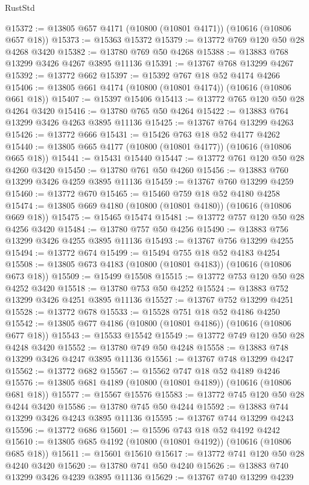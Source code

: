 \begin{lexlean}{RustStd}
\begin{coremodule}
@15372 := @13805 @657 @4171 (@10800 (@10801 @4171)) (@10616 (@10806 @657 @18))
@15373 := @15363 @15372
@15379 := @13772 @769 @120 @50 @28 @4268 @3420
@15382 := @13780 @769 @50 @4268
@15388 := @13883 @768 @13299 @3426 @4267 @3895 @11136
@15391 := @13767 @768 @13299 @4267
@15392 := @13772 @662
@15397 := @15392 @767 @18 @52 @4174 @4266
@15406 := @13805 @661 @4174 (@10800 (@10801 @4174)) (@10616 (@10806 @661 @18))
@15407 := @15397 @15406
@15413 := @13772 @765 @120 @50 @28 @4264 @3420
@15416 := @13780 @765 @50 @4264
@15422 := @13883 @764 @13299 @3426 @4263 @3895 @11136
@15425 := @13767 @764 @13299 @4263
@15426 := @13772 @666
@15431 := @15426 @763 @18 @52 @4177 @4262
@15440 := @13805 @665 @4177 (@10800 (@10801 @4177)) (@10616 (@10806 @665 @18))
@15441 := @15431 @15440
@15447 := @13772 @761 @120 @50 @28 @4260 @3420
@15450 := @13780 @761 @50 @4260
@15456 := @13883 @760 @13299 @3426 @4259 @3895 @11136
@15459 := @13767 @760 @13299 @4259
@15460 := @13772 @670
@15465 := @15460 @759 @18 @52 @4180 @4258
@15474 := @13805 @669 @4180 (@10800 (@10801 @4180)) (@10616 (@10806 @669 @18))
@15475 := @15465 @15474
@15481 := @13772 @757 @120 @50 @28 @4256 @3420
@15484 := @13780 @757 @50 @4256
@15490 := @13883 @756 @13299 @3426 @4255 @3895 @11136
@15493 := @13767 @756 @13299 @4255
@15494 := @13772 @674
@15499 := @15494 @755 @18 @52 @4183 @4254
@15508 := @13805 @673 @4183 (@10800 (@10801 @4183)) (@10616 (@10806 @673 @18))
@15509 := @15499 @15508
@15515 := @13772 @753 @120 @50 @28 @4252 @3420
@15518 := @13780 @753 @50 @4252
@15524 := @13883 @752 @13299 @3426 @4251 @3895 @11136
@15527 := @13767 @752 @13299 @4251
@15528 := @13772 @678
@15533 := @15528 @751 @18 @52 @4186 @4250
@15542 := @13805 @677 @4186 (@10800 (@10801 @4186)) (@10616 (@10806 @677 @18))
@15543 := @15533 @15542
@15549 := @13772 @749 @120 @50 @28 @4248 @3420
@15552 := @13780 @749 @50 @4248
@15558 := @13883 @748 @13299 @3426 @4247 @3895 @11136
@15561 := @13767 @748 @13299 @4247
@15562 := @13772 @682
@15567 := @15562 @747 @18 @52 @4189 @4246
@15576 := @13805 @681 @4189 (@10800 (@10801 @4189)) (@10616 (@10806 @681 @18))
@15577 := @15567 @15576
@15583 := @13772 @745 @120 @50 @28 @4244 @3420
@15586 := @13780 @745 @50 @4244
@15592 := @13883 @744 @13299 @3426 @4243 @3895 @11136
@15595 := @13767 @744 @13299 @4243
@15596 := @13772 @686
@15601 := @15596 @743 @18 @52 @4192 @4242
@15610 := @13805 @685 @4192 (@10800 (@10801 @4192)) (@10616 (@10806 @685 @18))
@15611 := @15601 @15610
@15617 := @13772 @741 @120 @50 @28 @4240 @3420
@15620 := @13780 @741 @50 @4240
@15626 := @13883 @740 @13299 @3426 @4239 @3895 @11136
@15629 := @13767 @740 @13299 @4239

\end{coremodule}
\end{lexlean}
